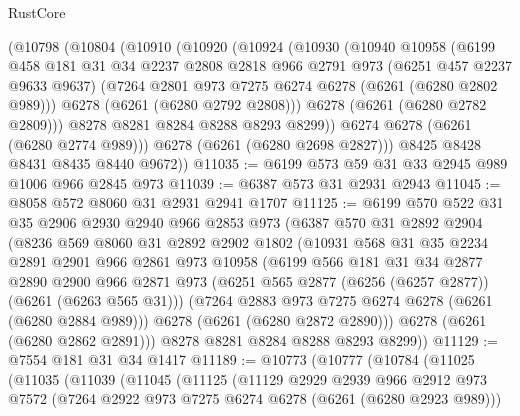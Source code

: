 \begin{lexlean}{RustCore}
\begin{coremodule}
    (@10798
      (@10804
        (@10910
          (@10920
            (@10924
              (@10930
                (@10940
                  @10958
                  (@6199
                    @458
                    @181
                    @31
                    @34
                    @2237
                    @2808
                    @2818
                    @966
                    @2791
                    @973
                    (@6251 @457 @2237 @9633 @9637)
                    (@7264 @2801 @973 @7275 @6274 @6278 (@6261 (@6280 @2802 @989)))
                    @6278
                    (@6261 (@6280 @2792 @2808)))
                  @6278
                  (@6261 (@6280 @2782 @2809)))
                @8278
                @8281
                @8284
                @8288
                @8293
                @8299))
            @6274
            @6278
            (@6261 (@6280 @2774 @989)))
          @6278
          (@6261 (@6280 @2698 @2827)))
        @8425
        @8428
        @8431
        @8435
        @8440
        @9672))
@11035 := @6199 @573 @59 @31 @33 @2945 @989 @1006 @966 @2845 @973
@11039 := @6387 @573 @31 @2931 @2943
@11045 := @8058 @572 @8060 @31 @2931 @2941 @1707
@11125 := @6199
    @570
    @522
    @31
    @35
    @2906
    @2930
    @2940
    @966
    @2853
    @973
    (@6387
      @570
      @31
      @2892
      @2904
      (@8236
        @569
        @8060
        @31
        @2892
        @2902
        @1802
        (@10931
          @568
          @31
          @35
          @2234
          @2891
          @2901
          @966
          @2861
          @973
          @10958
          (@6199
            @566
            @181
            @31
            @34
            @2877
            @2890
            @2900
            @966
            @2871
            @973
            (@6251 @565 @2877 (@6256 (@6257 @2877)) (@6261 (@6263 @565 @31)))
            (@7264 @2883 @973 @7275 @6274 @6278 (@6261 (@6280 @2884 @989)))
            @6278
            (@6261 (@6280 @2872 @2890)))
          @6278
          (@6261 (@6280 @2862 @2891)))
        @8278
        @8281
        @8284
        @8288
        @8293
        @8299))
@11129 := @7554 @181 @31 @34 @1417
@11189 := @10773
    (@10777
      (@10784
        (@11025
          (@11035
            (@11039
              (@11045
                (@11125
                  (@11129
                    @2929
                    @2939
                    @966
                    @2912
                    @973
                    @7572
                    (@7264 @2922 @973 @7275 @6274 @6278 (@6261 (@6280 @2923 @989)))

\end{coremodule}
\end{lexlean}
